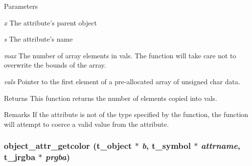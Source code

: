\begin{DoxyParams}{Parameters}
\item[{\em x}]The attribute's parent object \item[{\em s}]The attribute's name \item[{\em max}]The number of array elements in {\ttfamily vals}. The function will take care not to overwrite the bounds of the array. \item[{\em vals}]Pointer to the first element of a pre-\/allocated array of unsigned char data.\end{DoxyParams}
\begin{DoxyReturn}{Returns}
This function returns the number of elements copied into {\ttfamily vals}.
\end{DoxyReturn}
\begin{DoxyRemark}{Remarks}
If the attribute is not of the type specified by the function, the function will attempt to coerce a valid value from the attribute. 
\end{DoxyRemark}
\hypertarget{group__attr_ga56f5111a45905b64820eb96cc26f0956}{
\subsubsection[{object\_\-attr\_\-getcolor}]{ object\_\-attr\_\-getcolor ({\bf t\_\-object} $\ast$ {\em b}, \/  {\bf t\_\-symbol} $\ast$ {\em attrname}, \/  {\bf t\_\-jrgba} $\ast$ {\em prgba})}}
\label{group__attr_ga56f5111a45905b64820eb96cc26f0956}


